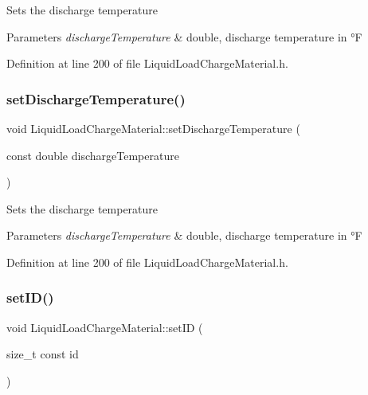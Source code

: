Sets the discharge temperature 
\begin{DoxyParams}{Parameters}
{\em discharge\+Temperature} & double, discharge temperature in °F \\
\hline
\end{DoxyParams}


Definition at line 200 of file Liquid\+Load\+Charge\+Material.\+h.

\mbox{\label{class_liquid_load_charge_material_a04ef0778e524f531b6dd2dd6137c270d}} 
\subsubsection{\texorpdfstring{set\+Discharge\+Temperature()}{setDischargeTemperature()}\hspace{0.1cm}{\footnotesize\ttfamily [3/3]}}
{\footnotesize\ttfamily void Liquid\+Load\+Charge\+Material\+::set\+Discharge\+Temperature (\begin{DoxyParamCaption}\item[{const double}]{discharge\+Temperature }\end{DoxyParamCaption})\hspace{0.3cm}{\ttfamily [inline]}}

Sets the discharge temperature 
\begin{DoxyParams}{Parameters}
{\em discharge\+Temperature} & double, discharge temperature in °F \\
\hline
\end{DoxyParams}


Definition at line 200 of file Liquid\+Load\+Charge\+Material.\+h.

\mbox{\label{class_liquid_load_charge_material_a3f6654f1d9387366e0ca7620ecc41361}} 
\subsubsection{\texorpdfstring{set\+I\+D()}{setID()}\hspace{0.1cm}{\footnotesize\ttfamily [1/3]}}
{\footnotesize\ttfamily void Liquid\+Load\+Charge\+Material\+::set\+ID (\begin{DoxyParamCaption}\item[{size\+\_\+t const}]{id }\end{DoxyParamCaption})\hspace{0.3cm}{\ttfamily [inline]}}

